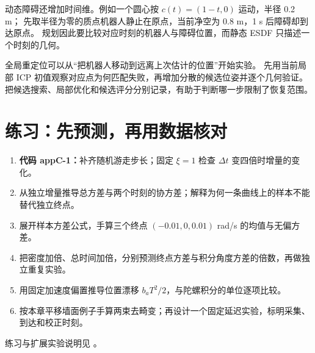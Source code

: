 动态障碍还增加时间维。例如一个圆心按 $c(t)=(1-t,0)$ 运动，半径 0.2 m；
先取半径为零的质点机器人静止在原点，当前净空为 0.8 m，1 s 后障碍却到达原点。
规划因此要比较对应时刻的机器人与障碍位置，而静态 ESDF 只描述一个时刻的几何。

全局重定位可以从“把机器人移动到远离上次估计的位置”开始实验。
先用当前局部 ICP 初值观察对应点为何匹配失败，再增加分散的候选位姿并逐个几何验证。
把候选搜索、局部优化和候选评分分别记录，有助于判断哪一步限制了恢复范围。

\section{练习：先预测，再用数据核对}
\begin{enumerate}
\item \textbf{代码 appC-1：}补齐随机游走步长；固定 $\xi=1$ 检查 $\Delta t$ 变四倍时增量的变化。
\item 从独立增量推导总方差与两个时刻的协方差；解释为何一条曲线上的样本不能替代独立终点。
\item 展开样本方差公式，手算三个终点 $(-0.01,0,0.01)$ rad/s 的均值与无偏方差。
\item 把密度加倍、总时间加倍，分别预测终点方差与积分角度方差的倍数，再做独立重复实验。
\item 用固定加速度偏置推导位置漂移 $b_aT^2/2$，与陀螺积分的单位逐项比较。
\item 按本章平移墙面例子手算两束去畸变；再设计一个固定延迟实验，标明采集、到达和校正时刻。
\end{enumerate}
练习与扩展实验说明见 。
